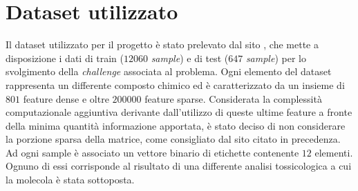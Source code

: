 \section{Dataset utilizzato}
Il dataset utilizzato per il progetto è stato prelevato dal sito \cite{dataset_site}, che mette a disposizione i dati di train ($12060$ \textit{sample}) e di test ($647$ \textit{sample}) per lo svolgimento della \textit{challenge} associata al problema.
Ogni elemento del dataset rappresenta un differente composto chimico ed è caratterizzato da un insieme di $801$ feature dense e oltre $200000$ feature sparse. Considerata la complessità computazionale aggiuntiva derivante dall'utilizzo di queste ultime feature a fronte della minima quantità informazione apportata, è stato deciso di non considerare la porzione sparsa della matrice, come consigliato dal sito citato in precedenza.\\
Ad ogni sample è associato un vettore binario di etichette contenente $12$ elementi. Ognuno di essi corrisponde al risultato di una differente analisi tossicologica a cui la molecola è stata sottoposta.\\

